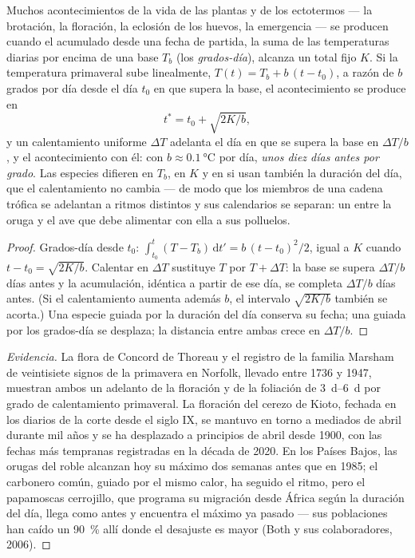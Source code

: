 \begin{theorem}\label{thm:b2:global-change:phenology}
Muchos acontecimientos de la vida de las plantas y de los ectotermos ---
la brotación, la floración, la eclosión de los huevos, la emergencia --- se
producen cuando el \emph{} acumulado desde una fecha de
partida, la suma de las temperaturas diarias por encima de una base $T_b$
(los \emph{grados-día}), alcanza un total fijo $K$. Si la temperatura
primaveral sube linealmente, $T(t) = T_b
+ b\,(t - t_0)$, a razón de $b$ grados por día desde el día $t_0$ en que
supera la base, el acontecimiento se produce en
\[
t^{*} = t_0 + \sqrt{2K/b},
\]
y un calentamiento uniforme $\Delta T$ adelanta el día en que se supera la
base en $\Delta T/b$, y el acontecimiento con él: con $b \approx
\qty{0.1}{\celsius}$ por día, \emph{unos diez días antes por
grado}. Las especies difieren en $T_b$, en $K$ y en si usan también la
duración del día, que el calentamiento no cambia --- de modo que los
miembros de una cadena trófica se adelantan a ritmos distintos y sus
calendarios se separan: un \emph{} entre la oruga y
el ave que debe alimentar con ella a sus polluelos.
\end{theorem}
\begin{proof}
Grados-día desde $t_0$: $\int_{t_0}^{t}(T - T_b)\,\mathrm{d}t' =
b\,(t - t_0)^{2}/2$, igual a $K$ cuando $t - t_0 = \sqrt{2K/b}$.
Calentar en $\Delta T$ sustituye $T$ por $T + \Delta T$: la base se supera
$\Delta T/b$ días antes y la acumulación, idéntica a partir de ese día,
se completa $\Delta T/b$ días antes. (Si el calentamiento aumenta además
$b$, el intervalo $\sqrt{2K/b}$ también se acorta.) Una especie guiada por
la duración del día conserva su fecha; una guiada por los grados-día se
desplaza; la distancia entre ambas crece en $\Delta T/b$.
\end{proof}
\begin{proof}[Evidencia]
La flora de Concord de Thoreau y el registro de la familia Marsham de
veintisiete signos de la primavera en Norfolk, llevado entre 1736 y 1947,
muestran ambos un adelanto de la floración y de la foliación de
\qtyrange{3}{6}{d} por grado de calentamiento primaveral. La floración del
cerezo de Kioto, fechada en los diarios de la corte desde el siglo IX, se
mantuvo en torno a mediados de abril durante mil años y se ha desplazado a
principios de abril desde 1900, con las fechas más tempranas registradas en
la década de 2020. En los Países Bajos, las orugas del roble alcanzan hoy
su máximo dos semanas antes que en 1985; el carbonero común, guiado por el
mismo calor, ha seguido el ritmo, pero el papamoscas cerrojillo, que
programa su migración desde África según la duración del día, llega como
antes y encuentra el máximo ya pasado --- sus poblaciones han caído un
\qty{90}{\%} allí donde el desajuste es mayor (Both y sus colaboradores,
2006).
\end{proof}

